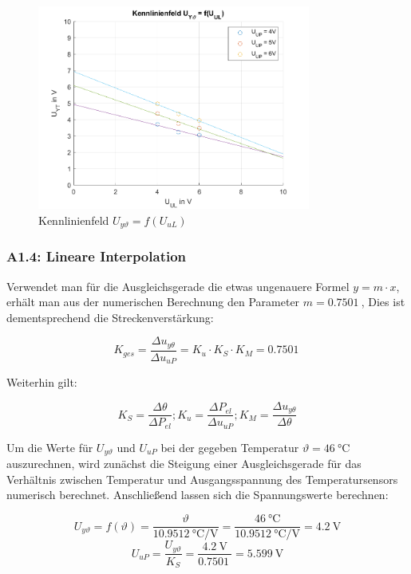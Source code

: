 \begin{figure}[h]
    \begin{center}
        \includegraphics[width=0.8\textwidth]{img/A1_2.png}
        \caption{Kennlinienfeld \( U_{y\vartheta} = f\left(U_{uL}\right) \)}
        \label{fig:A1_2_kennlinienfeld}
    \end{center}
\end{figure}

\subsubsection{A1.4: Lineare Interpolation}

Verwendet man für die Ausgleichsgerade die etwas ungenauere Formel \( y = m\cdot x \), erhält man aus der numerischen Berechnung den Parameter  \( m = \SI{0.7501}{} \), Dies ist dementsprechend die Streckenverstärkung:

\[K_{ges} = \frac{\Delta u_{y\theta}}{\Delta u_{uP}} = K_u \cdot K_S \cdot K_M = \SI{0.7501}{} \]

Weiterhin gilt:

\[K_S = \frac{\Delta \theta}{\Delta P_{el}} ; K_u = \frac{\Delta P_{el}}{\Delta u_{uP}} ; K_M = \frac{\Delta u_{y\theta}}{\Delta \theta}\]


Um die Werte für \( U_{y\vartheta} \) und \( U_{uP} \) bei der gegeben Temperatur \( \vartheta = \SI{46}{\celsius} \) auszurechnen, wird zunächst die Steigung einer Ausgleichsgerade für das Verhältnis zwischen Temperatur und Ausgangsspannung des Temperatursensors numerisch berechnet. Anschließend lassen sich die Spannungswerte berechnen:

\[ U_{y\vartheta} = f\left(\vartheta\right) = \frac{\vartheta}{\SI{10.9512}{\celsius\per\volt}} = \frac{\SI{46}{\celsius}}{\SI{10.9512}{\celsius\per\volt}} = \SI{4,2}{\volt} \]
\[ U_{uP} = \frac{U_{y\vartheta}}{K_S} = \frac{\SI{4,2}{\volt}}{\SI{0.7501}{}} = \SI{5,599}{\volt} \]

